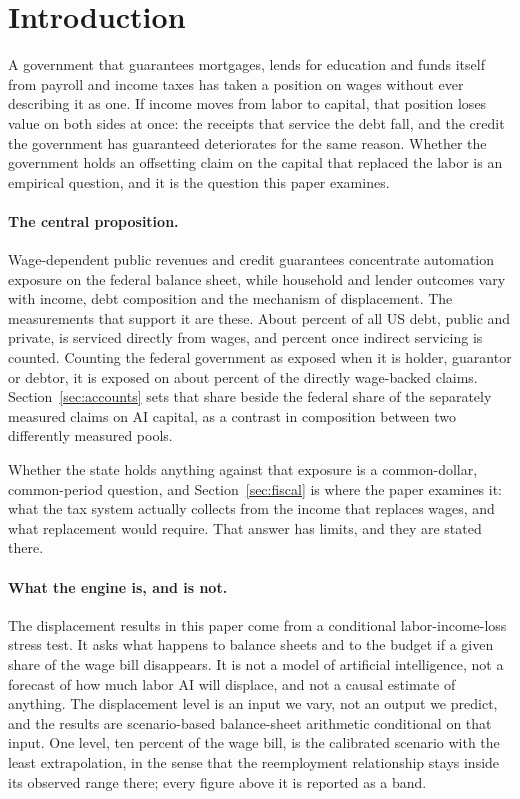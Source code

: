 \section{Introduction}
\label{sec:intro}

A government that guarantees mortgages, lends for education and funds itself from payroll and
income taxes has taken a position on wages without ever describing it as one. If income moves
from labor to capital, that position loses value on both sides at once: the receipts that service
the debt fall, and the credit the government has guaranteed deteriorates for the same reason.
Whether the government holds an offsetting claim on the capital that replaced the labor is an
empirical question, and it is the question this paper examines.

\paragraph{The central proposition.} Wage-dependent public revenues and credit guarantees
concentrate automation exposure on the federal balance sheet, while household and lender outcomes
vary with income, debt composition and the mechanism of displacement. The measurements that
support it are these. About  percent of all US debt, public and private, is
serviced directly from wages, and  percent once indirect servicing is
counted. Counting the federal government as exposed when it is holder, guarantor or debtor, it is
exposed on about  percent of the directly wage-backed claims.
Section~\ref{sec:accounts} sets that share beside the federal share of the separately measured
claims on AI capital, as a contrast in composition between two differently measured pools.

Whether the state holds anything against that exposure is a common-dollar, common-period
question, and Section~\ref{sec:fiscal} is where the paper examines it: what the tax system
actually collects from the income that replaces wages, and what replacement would require. That
answer has limits, and they are stated there.

\paragraph{What the engine is, and is not.} The displacement results in this paper come from a
conditional labor-income-loss stress test. It asks what happens to balance sheets and to the
budget if a given share of the wage bill disappears. It is not a model of artificial intelligence,
not a forecast of how much labor AI will displace, and not a causal estimate of anything. The
displacement level is an input we vary, not an output we predict, and the results are
scenario-based balance-sheet arithmetic conditional on that input. One level, ten percent of the
wage bill, is the calibrated scenario with the least extrapolation, in the sense that the
reemployment relationship stays inside its observed range there; every figure above it is reported
as a band.

